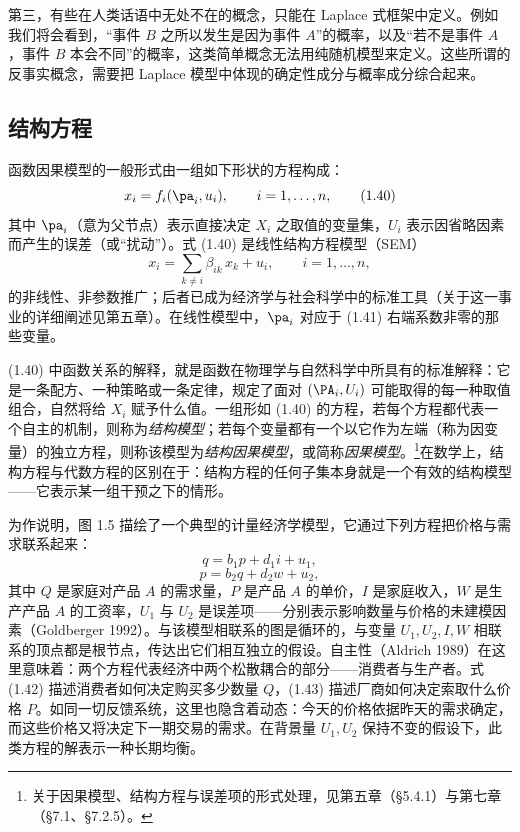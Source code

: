 第三，有些在人类话语中无处不在的概念，只能在 Laplace 式框架中定义。例如我们将会看到，“事件 $B$ 之所以发生是因为事件 $A$”的概率，以及“若不是事件 $A$，事件 $B$ 本会不同”的概率，这类简单概念无法用纯随机模型来定义。这些所谓的反事实概念，需要把 Laplace 模型中体现的确定性成分与概率成分综合起来。

\subsection{结构方程}

函数因果模型的一般形式由一组如下形状的方程构成：
\begin{equation}
x_i = f_i(\pa_i, u_i),\qquad i=1,\dots,n, \tag{1.40}
\end{equation}
其中 $\pa_i$（意为父节点）表示直接决定 $X_i$ 之取值的变量集，$U_i$ 表示因省略因素而产生的误差（或“扰动”）。式 \textup{(1.40)} 是线性结构方程模型（SEM）
\begin{equation}
x_i = \sum_{k\ne i} \beta_{ik}\,x_k + u_i,\qquad i=1,\dots,n, \tag{1.41}
\end{equation}
的非线性、非参数推广；后者已成为经济学与社会科学中的标准工具（关于这一事业的详细阐述见第五章）。在线性模型中，$\pa_i$ 对应于 \textup{(1.41)} 右端系数非零的那些变量。

\textup{(1.40)} 中函数关系的解释，就是函数在物理学与自然科学中所具有的标准解释：它是一条配方、一种策略或一条定律，规定了面对 $(\PA_i,U_i)$ 可能取得的每一种取值组合，自然将给 $X_i$ 赋予什么值。一组形如 \textup{(1.40)} 的方程，若每个方程都代表一个自主的机制，则称为\emph{结构模型}；若每个变量都有一个以它作为左端（称为因变量）的独立方程，则称该模型为\emph{结构因果模型}，或简称\emph{因果模型}。\footnote{关于因果模型、结构方程与误差项的形式处理，见第五章（\S 5.4.1）与第七章（\S 7.1、\S 7.2.5）。}在数学上，结构方程与代数方程的区别在于：结构方程的任何子集本身就是一个有效的结构模型——它表示某一组干预之下的情形。

为作说明，图 1.5 描绘了一个典型的计量经济学模型，它通过下列方程把价格与需求联系起来：
\begin{equation}
q = b_1 p + d_1 i + u_1, \tag{1.42}
\end{equation}
\begin{equation}
p = b_2 q + d_2 w + u_2, \tag{1.43}
\end{equation}
其中 $Q$ 是家庭对产品 $A$ 的需求量，$P$ 是产品 $A$ 的单价，$I$ 是家庭收入，$W$ 是生产产品 $A$ 的工资率，$U_1$ 与 $U_2$ 是误差项——分别表示影响数量与价格的未建模因素（Goldberger 1992）。与该模型相联系的图是循环的，与变量 $U_1,U_2,I,W$ 相联系的顶点都是根节点，传达出它们相互独立的假设。自主性（Aldrich 1989）在这里意味着：两个方程代表经济中两个松散耦合的部分——消费者与生产者。式 \textup{(1.42)} 描述消费者如何决定购买多少数量 $Q$，\textup{(1.43)} 描述厂商如何决定索取什么价格 $P$。如同一切反馈系统，这里也隐含着动态：今天的价格依据昨天的需求确定，而这些价格又将决定下一期交易的需求。在背景量 $U_1,U_2$ 保持不变的假设下，此类方程的解表示一种长期均衡。


